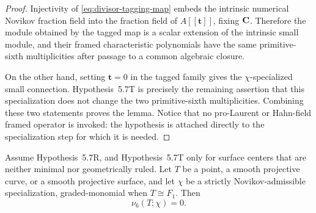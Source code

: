\begin{proof}
Injectivity of
\eqref{eq:divisor-tagging-map} embeds the intrinsic numerical Novikov
fraction field into the fraction field of $A[[\boldsymbol t]]$, fixing
$\mathbf C$.  Therefore the module obtained by the tagged map is a scalar extension
of the intrinsic small module, and their framed characteristic polynomials
have the same primitive-sixth multiplicities after passage to a common
algebraic closure.

On the other hand, setting $\boldsymbol t=0$ in the tagged family gives the
$\chi$-specialized small connection.  Hypothesis~5.7T is precisely the
remaining assertion that this specialization does not change the two
primitive-sixth multiplicities.  Combining these two statements proves the
lemma.  Notice that no pro-Laurent or Hahn-field framed operator is invoked:
the hypothesis is attached directly to the specialization step for which it
is needed.
\end{proof}

\begin{proposition}
\label{prop:low-dimensional-vanishing}
%
%
Assume Hypothesis~5.7R, and Hypothesis~5.7T only for surface centers that are
neither minimal nor geometrically ruled.  Let \(T\) be a point, a smooth
projective curve, or a smooth projective
surface, and let \(\chi\) be a strictly Novikov-admissible specialization,
graded-monomial when \(T\cong F_1\).  Then
\[
 \nu_6(T;\chi)=0.
 \label{eq:low-dimensional-vanishing}
\]
\end{proposition}

